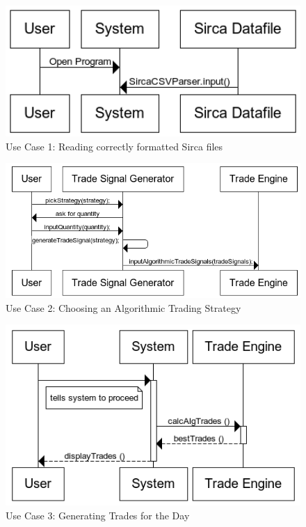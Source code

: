 \documentclass[a4paper]{article}
\begin{document}
\begin{figure}[H] 
   \includegraphics[width=1\textwidth]{images/readingSirca}
   \caption{Use Case 1: Reading correctly formatted Sirca files}
\end{figure}

\begin{figure}[H]
   \includegraphics[width=1\textwidth]{images/choosingAlgoStrat}
   \caption{Use Case 2: Choosing an Algorithmic Trading Strategy}
\end{figure}

\begin{figure}[H]
   \includegraphics[width=1\textwidth]{images/generatingTrades}
    \caption{Use Case 3: Generating Trades for the Day}
\end{figure}
\end{document}
